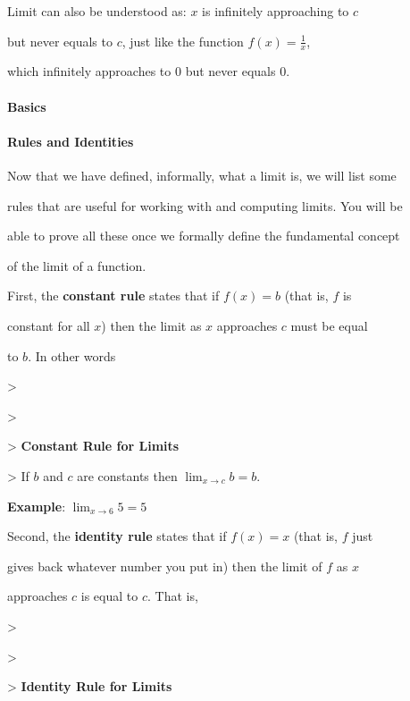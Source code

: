 Limit can also be understood as: $x$ is infinitely approaching to $c$

but never equals to $c$, just like the function $f(x)=\frac{1}{x}$,

which infinitely approaches to $0$ but never equals $0$.



\paragraph{Basics}



\paragraph{Rules and Identities}



Now that we have defined, informally, what a limit is, we will list some

rules that are useful for working with and computing limits. You will be

able to prove all these once we formally define the fundamental concept

of the limit of a function.



First, the \textbf{constant rule} states that if $f(x)=b$ (that is, $f$ is

constant for all $x$) then the limit as $x$ approaches $c$ must be equal

to $b$. In other words



> 

>

>    \textbf{Constant Rule for Limits}

>    If $b$ and $c$ are constants then $\lim_{x\to c}b=b$.



   \textbf{Example}: $\lim_{x\to6}5=5$



Second, the \textbf{identity rule} states that if $f(x)=x$ (that is, $f$ just

gives back whatever number you put in) then the limit of $f$ as $x$

approaches $c$ is equal to $c$. That is,



> 

>

>    \textbf{Identity Rule for Limits}

